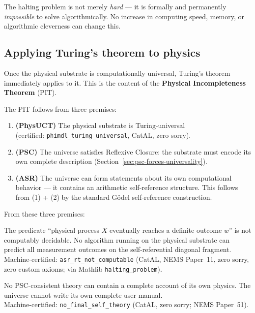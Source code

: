 \documentclass[11pt,a4paper]{article}
\newcommand{\term}[1]{\textbf{#1}}
\newcommand{\lean}[1]{\texttt{#1}}
\begin{document}
\begin{tcolorbox}[colback=boxblue,colframe=blue!40!black,title=Key insight]
The halting problem is not merely \emph{hard} — it is formally and permanently
\emph{impossible} to solve algorithmically.  No increase in computing speed, memory,
or algorithmic cleverness can change this.
\end{tcolorbox}

\subsection{Applying Turing's theorem to physics}

Once the physical substrate is computationally universal, Turing's theorem immediately
applies to it.  This is the content of the \term{Physical Incompleteness Theorem} (PIT).

The PIT follows from three premises:
\begin{enumerate}
\item \textbf{(PhysUCT)} The physical substrate is Turing-universal\\
  (certified: \lean{phimdl\_turing\_universal}, CatAL, zero sorry).
\item \textbf{(PSC)} The universe satisfies Reflexive Closure: the substrate must
  encode its own complete description (Section~\ref{sec:psc-forces-universality}).
\item \textbf{(ASR)} The universe can form statements about its own computational
  behavior — it contains an arithmetic self-reference structure.  This follows from
  (1) + (2) by the standard Gödel self-reference construction.
\end{enumerate}

From these three premises:

\begin{tcolorbox}[colback=boxorange,colframe=orange!60!black,
  title={PIT Form~A: Computational Undecidability (CatAL)}]
The predicate ``physical process $X$ eventually reaches a definite outcome $w$'' is
not computably decidable.  No algorithm running on the physical substrate can predict
all measurement outcomes on the self-referential diagonal fragment.\\[4pt]
Machine-certified: \lean{asr\_rt\_not\_computable} (CatAL, NEMS Paper~11,
zero sorry, zero custom axioms; via Mathlib \texttt{halting\_problem}).
\end{tcolorbox}

\begin{tcolorbox}[colback=boxorange,colframe=orange!60!black,
  title={PIT Form~B: No Final Self-Theory (CatAL)}]
No PSC-consistent theory can contain a complete account of its own physics.
The universe cannot write its own complete user manual.\\[4pt]
Machine-certified: \lean{no\_final\_self\_theory} (CatAL, zero sorry;
NEMS Paper~51).
\end{tcolorbox}
\end{document}

